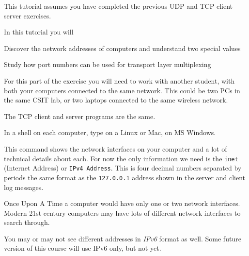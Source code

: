 








\begin{itshape}
This tutorial assumes you have completed the previous UDP and TCP client server exercises.
\end{itshape}


In this tutorial you will

\DOT Discover the network addresses of computers and understand two special values

\DOT Study how port numbers can be used for transport layer multiplexing



For this part of the exercise you will need to work with another student, with both your
computers connected to the same network. This could be two PCs in the same CSIT lab, or
two laptops connected to the same wireless network.

The TCP client and server programs are the same.

\STEP In a shell on each computer, type  on a Linux or Mac,
 on MS Windows.

This command shows the network interfaces on your computer and a lot of technical details
about each. For now the only information we need is the \texttt{inet} (Internet Address)
or \texttt{IPv4 Address}. This is four decimal numbers separated by periods \DSH the same
format as the \texttt{127.0.0.1} address shown in the server and client log messages.

\begin{IMPORTANT}
Once Upon A Time a computer would have only one or two network interfaces. Modern 21st
century computers may have lots of different network interfaces to search through.

You may or may not see different addresses in \emph{IPv6} format as well. Some future version
of this course will use IPv6 only, but not yet.
\end{IMPORTANT}

